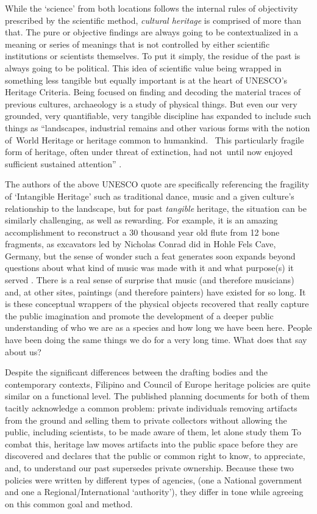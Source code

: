 While the ‘science’ from both locations follows the internal rules of objectivity prescribed by the scientific method, \textit{cultural heritage} is comprised of more than that. The pure or objective findings are always going to be contextualized in a meaning or series of meanings that is not controlled by either scientific institutions or scientists themselves. To put it simply, the residue of the past is always going to be political. This idea of scientific value being wrapped in something less tangible but equally important is at the heart of UNESCO’s Heritage Criteria. Being focused on finding and decoding the material traces of previous cultures, archaeology is a study of physical things. But even our very grounded, very quantifiable, very tangible discipline has expanded to include such things as “landscapes, industrial remains and other various forms with the notion of World Heritage or heritage common to humankind.  This particularly fragile form of heritage, often under threat of extinction, had not until now enjoyed sufficient sustained attention” 
\parencite{UNESCO2015}. 

The authors of the above UNESCO quote are specifically referencing the fragility of ‘Intangible Heritage’ such as traditional dance, music and a given culture’s relationship to the landscape, but for past \textit{tangible} heritage, the situation can be similarly challenging, as well as rewarding. 
For example, it is an amazing accomplishment to reconstruct a \num{30} thousand year old flute from \num{12} bone fragments, as excavators led by Nicholas Conrad did in Hohle Fels Cave, Germany, but the sense of wonder such a feat generates soon expands beyond questions about what kind of music was made with it and what purpose(s) it served \parencite{conard2009}. 
There is a real sense of surprise that music (and therefore musicians) and, at other sites, paintings (and therefore painters) have existed for so long. It is these conceptual wrappers of the physical objects recovered that really capture the public imagination and promote the development of a deeper public understanding of who we are as a species and how long we have been here. People have been doing the same things we do for a very long time. What does that say about us?

Despite the significant differences between the drafting bodies and the contemporary contexts, Filipino and Council of Europe heritage policies are quite similar on a functional level. The published planning documents for both of them tacitly acknowledge a common problem: private individuals removing artifacts from the ground and selling them to private collectors without allowing the public, including scientists, to be made aware of them, let alone study them %
To combat this, heritage law moves artifacts into the public space before they are discovered and declares that the public or common right to know, to appreciate, and, to understand our past supersedes private ownership. Because these two policies were written by different types of agencies, (one a National government and one a Regional/International ‘authority’), they differ in tone while agreeing on this common goal and method. 


